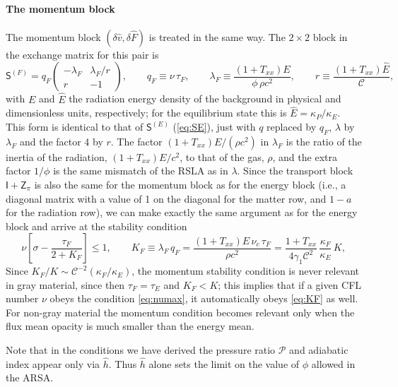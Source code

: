 \documentclass[preprint,12pt,authoryear]{elsarticle}
\newcommand{\tenS}{\mathsf{S}}
\newcommand{\tenI}{\mathsf{I}}
\newcommand{\tenZ}{\mathsf{Z}}
\newcommand{\hE}{\hat{E}}
\newcommand{\hv}{\hat{v}}
\newcommand{\hF}{\hat{F}}
\newcommand{\calC}{\mathcal{C}}
\newcommand{\calP}{\mathcal{P}}
\begin{document}
\paragraph{The momentum block} The momentum block $(\delta\hv, \delta\hF)$ is treated in the same way. The $2\times 2$ block in the exchange matrix for this pair is
\begin{equation}
    \tenS^{(F)} = q_F\left(\begin{array}{cc} -\lambda_F & \lambda_F/r \\ r & -1 \end{array}\right),
    \qquad
    q_F \equiv \nu\,\tau_F,
    \qquad
    \lambda_F \equiv \frac{(1 + T_{xx})E}{\phi\,\rho c^2},
    \qquad
    r \equiv \frac{(1 + T_{xx})\hE}{\calC},
    \label{eq:SF}
\end{equation}
with $E$ and $\hE$ the radiation energy density of the background in physical and dimensionless units, respectively; for the equilibrium state this is $\hE=\kappa_P/\kappa_E$. This form is identical to that of $\tenS^{(E)}$ (\autoref{eq:SE}), just with $q$ replaced by $q_F$, $\lambda$ by $\lambda_F$ and the factor 4 by $r$. The factor $(1 + T_{xx})E/(\rho c^2)$ in $\lambda_F$ is the ratio of the inertia of the radiation, $(1 + T_{xx})E/c^2$, to that of the gas, $\rho$, and the extra factor $1/\phi$ is the same mismatch of the RSLA as in $\lambda$. Since the transport block $\tenI + \tenZ_\pi$ is also the same for the momentum block as for the energy block (i.e., a diagonal matrix with a value of 1 on the diagonal for the matter row, and $1-a$ for the radiation row), we can make exactly the same argument as for the energy block and arrive at the stability condition
\begin{equation}
    \nu\left[\sigma - \frac{\tau_F}{2 + K_F}\right] \leq 1,
    \qquad
    K_F \equiv \lambda_F\,q_F = \frac{(1 + T_{xx})E\,\nu_c\,\tau_F}{\rho c^2} = \frac{1 + T_{xx}}{4\gamma_1\calC^2}\,\frac{\kappa_F}{\kappa_E}\,K ,
    \label{eq:KF}
\end{equation}
Since $K_F/K \sim \calC^{-2} (\kappa_F/\kappa_E)$, the momentum stability condition is never relevant in gray material, since then $\tau_F = \tau_E$ and $K_F < K$; this implies that if a given CFL number $\nu$ obeys the condition \autoref{eq:numax}, it automatically obeys \autoref{eq:KF} as well. For non-gray material the momentum condition becomes relevant only when the flux mean opacity is much smaller than the energy mean.

Note that in the conditions we have derived the pressure ratio $\calP$ and adiabatic index appear only via $\hat{h}$. Thus $\hat{h}$ alone sets the limit on the value of $\phi$ allowed in the ARSA.
\end{document}
